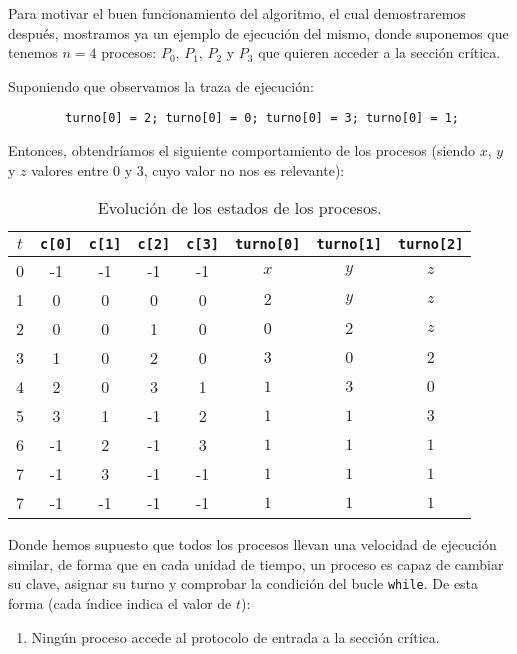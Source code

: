 \begin{ejemplo}
    Para motivar el buen funcionamiento del algoritmo, el cual demostraremos después, mostramos ya un ejemplo de ejecución del mismo, donde suponemos que tenemos $n=4$ procesos: $P_0$, $P_1$, $P_2$ y $P_3$ que quieren acceder a la sección crítica.

    Suponiendo que observamos la traza de ejecución:
    \begin{verbatim}
        turno[0] = 2; turno[0] = 0; turno[0] = 3; turno[0] = 1;
    \end{verbatim}
    Entonces, obtendríamos el siguiente comportamiento de los procesos (siendo $x$, $y$ y $z$ valores entre 0 y 3, cuyo valor no nos es relevante):
    \begin{table}[H]
    \centering
    \begin{tabular}{|c|c|c|c|c|c|c|c|}
        \hline
        $t$ & \verb|c[0]| & \verb|c[1]| & \verb|c[2]| & \verb|c[3]| & \verb|turno[0]| & \verb|turno[1]| & \verb|turno[2]| \\
        \hline
        0 & -1 & -1 & -1 & -1 & $x$ & $y$ & $z$ \\
        \hline
        1 & 0 & 0 & 0 & 0 & $2$ & $y$ & $z$ \\
        \hline
        2 & 0 & 0 & 1 & 0 & $0$ & $2$ & $z$ \\
        \hline
        3 & 1 & 0 & 2 & 0 & $3$ & $0$ & $2$ \\
        \hline
        4 & 2 & 0 & 3 & 1 & $1$ & $3$ & $0$ \\
        \hline
        5 & 3 & 1 & -1 & 2 & $1$ & $1$ & $3$ \\
        \hline
        6 & -1 & 2 & -1 & 3 & $1$ & $1$ & $1$ \\
        \hline
        7 & -1 & 3 & -1 & -1 & $1$ & $1$ & $1$ \\
        \hline
        7 & -1 & -1 & -1 & -1 & $1$ & $1$ & $1$ \\
        \hline
    \end{tabular}
    \caption{Evolución de los estados de los procesos.}
    \end{table}
    Donde hemos supuesto que todos los procesos llevan una velocidad de ejecución similar, de forma que en cada unidad de tiempo, un proceso es capaz de cambiar su clave, asignar su turno y comprobar la condición del bucle \verb|while|. De esta forma (cada índice indica el valor de $t$):
    \begin{enumerate}[label=(\arabic*), start=0]
        \item Ningún proceso accede al protocolo de entrada a la sección crítica.

\end{enumerate}
\end{ejemplo}
